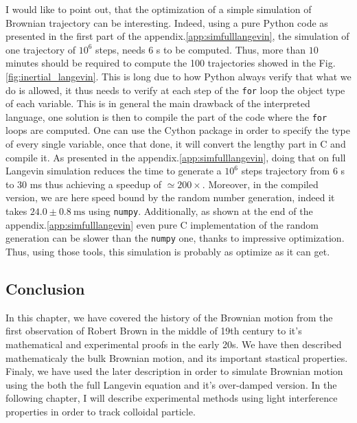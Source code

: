 I would like to point out, that the optimization of a simple simulation of Brownian trajectory can be interesting. Indeed, using a pure Python code as presented in the first part of the appendix.\ref{app:simfulllangevin}, the simulation of one trajectory of $10^6$ steps, needs $6$ s to be computed. Thus, more than $10$ minutes should be required to compute the 100 trajectories showed in the Fig.\ref{fig:inertial_langevin}. This is long due to how Python always verify that what we do is allowed, it thus needs to verify at each step of the \texttt{for} loop the object type of each variable. This is in general the main drawback of the interpreted language, one solution is then to compile the part of the code where the \texttt{for} loops are computed. One can use the Cython package in order to specify the type of every single variable, once that done, it will convert the lengthy part in C and compile it. As presented in the appendix.\ref{app:simfulllangevin}, doing that on full Langevin simulation reduces the time to generate a $10^6$ steps trajectory from $6$ s to $30$ ms thus achieving a speedup of $\simeq 200 \times$. Moreover, in the compiled version, we are here speed bound by the random number generation, indeed it takes $ 24.0 \pm 0.8 ~ \mathrm{ms}$ using \texttt{numpy}. Additionally, as shown at the end of the appendix.\ref{app:simfulllangevin} even pure C implementation of the random generation can be slower than the \texttt{numpy} one, thanks to impressive optimization. Thus, using those tools, this simulation is probably as optimize as it can get.

\subsection{Conclusion}

In this chapter, we have covered the history of the Brownian motion from the first observation of Robert Brown in the middle of 19th century to it's mathematical and experimental proofs in the early 20s. We have then described mathematicaly the bulk Brownian motion, and its important stastical properties. Finaly, we have used the later description in order to simulate Brownian motion using the both the full Langevin equation and it's over-damped version. In the following chapter, I will describe experimental methods using light interference properties in order to track colloidal particle.
